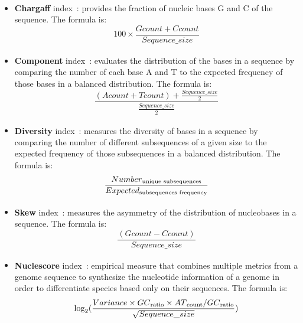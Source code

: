 \begin{itemize}
	\item \textbf{Chargaff} index~\textsuperscript{\cite{Clarke-Hurst-2006}}: provides the fraction of nucleic bases G and C of the sequence.
	      The formula is:
	      \begin{equation}
		      100 \times \frac{Gcount + Ccount}{Sequence\_size}
	      \end{equation}
	\item \textbf{Component} index~\textsuperscript{\cite{Mrazek-Karlin-1998}}: evaluates the distribution of the bases in a sequence
	      by comparing the number of each base A and T to the expected frequency of those bases in a balanced distribution. The formula is:
	      \begin{equation}
		      \frac{(Acount + Tcount) + \frac{Sequence\_size}{2}}{\frac{Sequence\_size}{2}}
	      \end{equation}
	\item \textbf{Diversity} index~\textsuperscript{\cite{Peregrin-Alvarez-Parkinson-2007}}: measures the diversity of bases in a sequence
	      by comparing the number of different subsequences of a given size to the expected frequency of those subsequences in a balanced
	      distribution. The formula is:
	      \begin{equation}
		      \frac{Number\textsubscript{unique subsequences}}{Expected\textsubscript{subsequences frequency}}
	      \end{equation}
	\item \textbf{Skew} index~\textsuperscript{\cite{Arakawa-Tomita-2007}}: measures the asymmetry of the distribution of nucleobases in
	      a sequence. The formula is:
	      \begin{equation}
		      \frac{(Gcount - Ccount)}{Sequence\_size}
	      \end{equation}
	\item \textbf{Nuclescore} index~\textsuperscript{\cite{Moco-et-al-2022}}: empirical measure that combines multiple metrics from a genome sequence to synthesize the nucleotide
	      information of a genome in order to differentiate species based only on their sequences. The formula is:
	      \begin{equation}
		      \log_{2}(\frac{Variance \times GC\textsubscript{ratio} \times AT\textsubscript{count}/GC\textsubscript{ratio}}{\sqrt{Sequence\_size}})
	      \end{equation}
\end{itemize}

